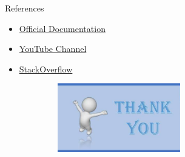 \documentclass[aspectratio=169,serif,professionalfont]{beamer}
\begin{document}
\begin{frame}{References}
    \begin{itemize}
    \item \href{https://shiny.rstudio.com/tutorial/written-tutorial/lesson1/}{Official Documentation}
    \item \href{https://www.youtube.com/watch?v=z5bUzdIbIyg&feature=youtu.be}{YouTube Channel}
    \item \href{https://stackoverflow.com/questions/40811903/in-shiny-update-datatable-with-new-values-from-user-input}{StackOverflow}
\end{itemize}
\vspace{1cm}
\begin{figure}[htbp]
    \centering
    \includegraphics[width=0.7\textwidth,height=3cm]{thanks.png}
    \label{fig:image_label11}
   \end{figure}
\end{frame}
\end{document}
